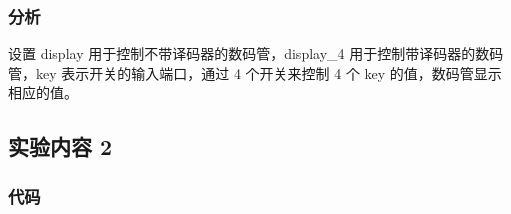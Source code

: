 \documentclass[a4paper]{article}
\begin{document}
        \subsubsection{分析}
            \par 设置 display 用于控制不带译码器的数码管，display\_4 用于控制带译码器的数码管，key 表示开关的输入端口，通过 4 个开关来控制 4 个 key 的值，数码管显示相应的值。

    \subsection{实验内容 2}

        \subsubsection{代码}
\end{document}

